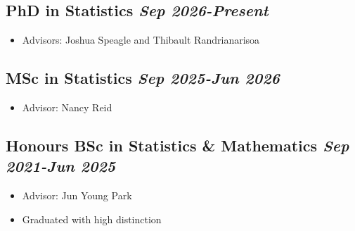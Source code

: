 \vspace*{10pt}
\subsection{PhD in Statistics
  \hfill {\normalfont\itshape Sep 2026-Present}}
\begin{itemize}[topsep=2pt, partopsep=0pt, parsep=0pt, itemsep=0pt]
    \item Advisors: Joshua Speagle and Thibault Randrianarisoa
\end{itemize}

\vspace*{6pt}
\subsection{MSc in Statistics
  \hfill {\normalfont\itshape Sep 2025-Jun 2026}}
\begin{itemize}[topsep=2pt, partopsep=0pt, parsep=0pt, itemsep=0pt]
    \item Advisor: Nancy Reid
\end{itemize}

\vspace*{6pt}
\subsection{Honours BSc in Statistics \& Mathematics
  \hfill {\normalfont\itshape Sep 2021-Jun 2025}}
\begin{itemize}[topsep=2pt, partopsep=0pt, parsep=0pt, itemsep=0pt]
    \item Advisor: Jun Young Park
    \item Graduated with high distinction
\end{itemize}